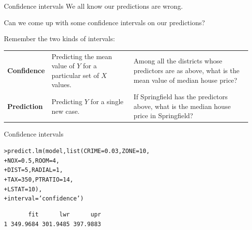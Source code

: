\documentclass{beamer}\usepackage[]{graphicx}\usepackage[]{color}
\makeatletter
\newcommand{\hlnum}[1]{\textcolor[rgb]{0.824,0.412,0.118}{#1}}%
\newcommand{\hlstr}[1]{\textcolor[rgb]{1,0.894,0.71}{#1}}%
\newcommand{\hlstd}[1]{\textcolor[rgb]{1,0.894,0.769}{#1}}%
\newcommand{\hlkwc}[1]{\textcolor[rgb]{0.78,0.941,0.545}{#1}}%
\newcommand{\hlkwd}[1]{\textcolor[rgb]{1,0.78,0.769}{#1}}%
\newenvironment{kframe}{%
 \def\at@end@of@kframe{}%
 \ifinner\ifhmode%
  \def\at@end@of@kframe{\end{minipage}}%
  \begin{minipage}{\columnwidth}%
 \fi\fi%
 \def\FrameCommand##1{\hskip\@totalleftmargin \hskip-\fboxsep
 \colorbox{shadecolor}{##1}\hskip-\fboxsep
     \hskip-\linewidth \hskip-\@totalleftmargin \hskip\columnwidth}%
 \MakeFramed {\advance\hsize-\width
   \@totalleftmargin\z@ \linewidth\hsize
   \@setminipage}}%
 {\par\unskip\endMakeFramed%
 \at@end@of@kframe}
\newenvironment{knitrout}{}{} %
\makeatother
\begin{document}
\begin{darkframes}
    \begin{frame}[fragile]{Confidence intervals}
      We all know our predictions are wrong. 
      
      Can we come up with some confidence intervals on our predictions? \pause
      \bigskip
      
      Remember the two kinds of intervals:
      \bigskip

      \begin{tabular}{lp{1in}p{2in}}
        \textbf{Confidence} & Predicting the mean value of $Y$ for a particular  set of $X$ values. & Among all the districts whose predictors are as above, what is the mean value of median house price?  \\
        \textbf{Prediction} & Predicting $Y$ for a single new case. & If Springfield has the predictors above, what is the median house price in Springfield?\\
      \end{tabular}
    
    
    \end{frame}
        
      
    
    \begin{frame}[fragile]{Confidence intervals}
    
\begin{knitrout}
\begin{kframe}
\begin{alltt}
\hlstd{> }\hlkwd{predict.lm}\hlstd{(model,} \hlkwd{list}\hlstd{(}\hlkwc{CRIME}\hlstd{=}\hlnum{0.03}\hlstd{,} \hlkwc{ZONE}\hlstd{=}\hlnum{10}\hlstd{,}
\hlstd{+ }                       \hlkwc{NOX}\hlstd{=}\hlnum{0.5}\hlstd{,} \hlkwc{ROOM}\hlstd{=}\hlnum{4}\hlstd{,}
\hlstd{+ }                       \hlkwc{DIST}\hlstd{=}\hlnum{5}\hlstd{,}  \hlkwc{RADIAL}\hlstd{=}\hlnum{1}\hlstd{,}
\hlstd{+ }                       \hlkwc{TAX}\hlstd{=}\hlnum{350}\hlstd{,} \hlkwc{PTRATIO}\hlstd{=}\hlnum{14}\hlstd{,}
\hlstd{+ }                       \hlkwc{LSTAT}\hlstd{=}\hlnum{10}\hlstd{),}
\hlstd{+ }                       \hlkwc{interval} \hlstd{=} \hlstr{'confidence'}\hlstd{)}
\end{alltt}
\begin{verbatim}
       fit      lwr      upr
1 349.9684 301.9485 397.9883
\end{verbatim}
\end{kframe}
\end{knitrout}
     \lc
     \end{frame}
     

\end{darkframes}
\end{document}
